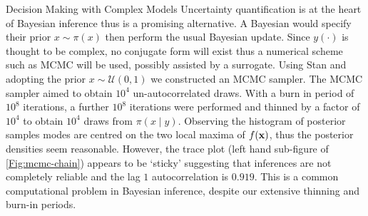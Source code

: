 \begin{chapter}{Decision Making with Complex Models \label{Chap:optimisation}}
Uncertainty quantification is at the heart of Bayesian inference thus is a promising alternative. A Bayesian would specify their prior $x \sim \pi(x)$ then perform the usual Bayesian update. Since $y(\cdot)$ is thought to be complex, no conjugate form will exist thus a numerical scheme such as MCMC will be used, possibly assisted by a surrogate. Using Stan \citep{stan} and adopting the prior $x \sim \mathcal{U}(0,1)$ we constructed an MCMC sampler. The MCMC sampler aimed to obtain $10^4$ un-autocorrelated draws. With a burn in period of $10^8$ iterations, a further $10^8$ iterations were performed and thinned by a factor of $10^4$ to obtain $10^4$ draws from $\pi(x \mid y)$. Observing the histogram of posterior samples  modes are centred on the two local maxima of $f(\mathbf{x})$, thus the posterior densities seem reasonable. However, the trace plot (left hand sub-figure of \cref{Fig:mcmc-chain}) appears to be `sticky' suggesting that inferences are not completely reliable and the lag $1$ autocorrelation is $0.919$. This is a common computational problem in Bayesian inference, despite our extensive thinning and burn-in periods.


\end{chapter}
